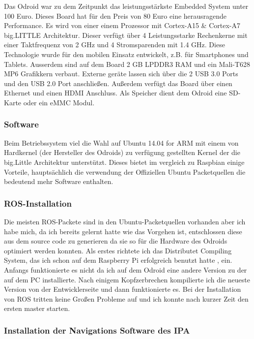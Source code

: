 Das Odroid war zu dem Zeitpunkt das leistungsstärkste Embedded System unter 100 Euro. Dieses Board hat für den Preis von 80 Euro eine herausragende Performance.
Es wird von einer einem Prozessor mit Cortex-A15 \& Cortex-A7 big.LITTLE Architektur. Dieser verfügt über 4 Leistungsstarke Rechenkerne mit einer Taktfrequenz von 2 GHz und 4 Stromsparenden mit 1.4 GHz. Diese Technologie wurde für den mobilen Einsatz entwickelt, z.B. für Smartphones und Tablets.
Ausserdem sind auf dem Board 2 GB LPDDR3 RAM und ein Mali-T628 MP6 Grafikkern verbaut. Externe geräte lassen sich über die 2 USB 3.0 Ports und den USB 2.0 Port anschließen. Außerdem verfügt das Board über einen Ethernet und einen HDMI Anschluss.
Als Speicher dient dem Odroid eine SD-Karte oder ein eMMC Modul.

\subsubsection{Software}

Beim Betriebssystem viel die Wahl auf Ubuntu 14.04 for ARM mit einem von Hardkernel (der Hersteller des Odroids) zu verfügung gestellten Kernel der die big.Little Architektur unterstützt.
Dieses bietet im vergleich zu Raspbian einige Vorteile, hauptsächlich die verwendung der Offiziellen Ubuntu Packetquellen die bedeutend mehr Software enthalten.

\subsubsection{ROS-Installation}

Die meisten ROS-Packete sind in den Ubuntu-Packetquellen vorhanden aber ich habe mich, da ich bereits gelernt hatte wie das Vorgehen ist, entschlossen diese aus dem \Gls{source code} zu generieren da sie so für die Hardware des Odroids optimiert werden konnten. 
Als erstes richtete ich das Distributet Compiling System, das ich schon auf dem Raspberry Pi erfolgreich benutzt hatte , ein. Anfangs funktionierte es nicht da ich auf dem Odroid eine andere Version zu der auf dem PC installierte. Nach einigem Kopfzerbrechen kompilierte ich die neueste Version von der Entwicklerseite und dann funktionierte es.
Bei der Installation von ROS tritten keine Großen Probleme auf und ich konnte nach kurzer Zeit den ersten \Gls{master} starten.

\subsubsection{Installation der Navigations Software des IPA}

